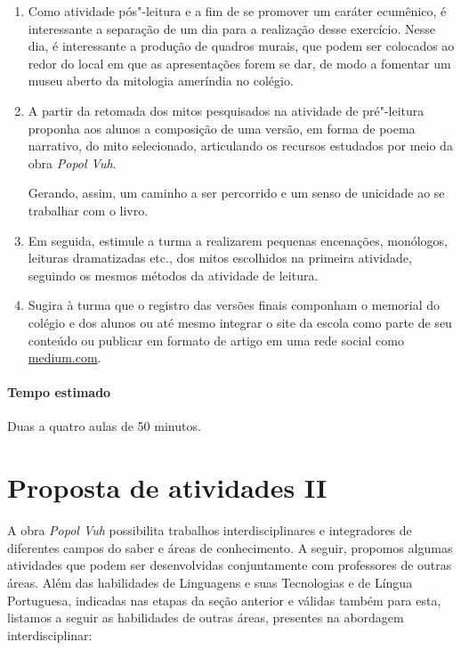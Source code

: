 \documentclass[11pt]{extarticle}
\begin{document}
\begin{enumerate}
\item
Como atividade pós"-leitura e a fim de se promover um caráter ecumênico, é
interessante a separação de um dia para a realização desse exercício. Nesse
dia, é interessante a produção de quadros murais, que podem ser
colocados ao redor do local em que as apresentações forem se dar, de
modo a fomentar um museu aberto da mitologia ameríndia no colégio. 

\item
A partir da retomada dos mitos pesquisados na atividade de pré"-leitura proponha aos 
alunos a composição de uma versão, em forma de poema narrativo, do mito selecionado, 
articulando os recursos estudados por meio da obra \emph{Popol Vuh}.

Gerando, assim, um caminho a ser percorrido e um senso de unicidade ao se trabalhar com o
livro. 

\item
Em seguida, estimule a turma a realizarem pequenas encenações,
monólogos, leituras dramatizadas etc., dos mitos escolhidos na primeira
atividade, seguindo os mesmos métodos da atividade de leitura.

\item
Sugira à turma que o registro das versões finais componham o memorial do colégio e
dos alunos ou até mesmo integrar o site da escola como parte de seu conteúdo ou 
publicar em formato de artigo em uma rede social como \url{medium.com}.

\end{enumerate}

\paragraph{Tempo estimado} Duas a quatro aulas de 50 minutos. 

\section{Proposta de atividades II}

A obra \emph{Popol Vuh} possibilita trabalhos interdisciplinares e
integradores de diferentes campos do saber e áreas de conhecimento. A
seguir, propomos algumas atividades que podem ser desenvolvidas
conjuntamente com professores de outras áreas. Além das habilidades de
Linguagens e suas Tecnologias e de Língua Portuguesa, indicadas nas
etapas da seção anterior e válidas também para esta, listamos a seguir
as habilidades de outras áreas, presentes na abordagem interdisciplinar:
\end{document}
